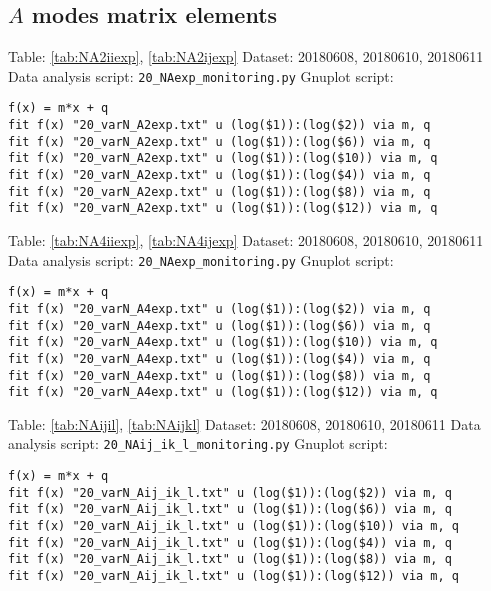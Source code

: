 \documentclass[12pt,a4paper]{article}
\begin{document}
\subsection{$A$ modes matrix elements}
Table: \ref{tab:NA2iiexp}, \ref{tab:NA2ijexp} \newline
Dataset: 20180608, 20180610, 20180611\newline
Data analysis script: \verb|20_NAexp_monitoring.py|\newline
Gnuplot script:
\begin{lstlisting}
f(x) = m*x + q
fit f(x) "20_varN_A2exp.txt" u (log($1)):(log($2)) via m, q
fit f(x) "20_varN_A2exp.txt" u (log($1)):(log($6)) via m, q
fit f(x) "20_varN_A2exp.txt" u (log($1)):(log($10)) via m, q
fit f(x) "20_varN_A2exp.txt" u (log($1)):(log($4)) via m, q
fit f(x) "20_varN_A2exp.txt" u (log($1)):(log($8)) via m, q
fit f(x) "20_varN_A2exp.txt" u (log($1)):(log($12)) via m, q
\end{lstlisting}
\mbox{}\newline
Table: \ref{tab:NA4iiexp}, \ref{tab:NA4ijexp} \newline
Dataset: 20180608, 20180610, 20180611\newline
Data analysis script: \verb|20_NAexp_monitoring.py|\newline
Gnuplot script:
\begin{lstlisting}
f(x) = m*x + q
fit f(x) "20_varN_A4exp.txt" u (log($1)):(log($2)) via m, q
fit f(x) "20_varN_A4exp.txt" u (log($1)):(log($6)) via m, q
fit f(x) "20_varN_A4exp.txt" u (log($1)):(log($10)) via m, q
fit f(x) "20_varN_A4exp.txt" u (log($1)):(log($4)) via m, q
fit f(x) "20_varN_A4exp.txt" u (log($1)):(log($8)) via m, q
fit f(x) "20_varN_A4exp.txt" u (log($1)):(log($12)) via m, q
\end{lstlisting}
\mbox{}\newline
Table: \ref{tab:NAijil}, \ref{tab:NAijkl} \newline
Dataset: 20180608, 20180610, 20180611\newline
Data analysis script: \verb|20_NAij_ik_l_monitoring.py|\newline
Gnuplot script:
\begin{lstlisting}
f(x) = m*x + q
fit f(x) "20_varN_Aij_ik_l.txt" u (log($1)):(log($2)) via m, q
fit f(x) "20_varN_Aij_ik_l.txt" u (log($1)):(log($6)) via m, q
fit f(x) "20_varN_Aij_ik_l.txt" u (log($1)):(log($10)) via m, q
fit f(x) "20_varN_Aij_ik_l.txt" u (log($1)):(log($4)) via m, q
fit f(x) "20_varN_Aij_ik_l.txt" u (log($1)):(log($8)) via m, q
fit f(x) "20_varN_Aij_ik_l.txt" u (log($1)):(log($12)) via m, q
\end{lstlisting}
\end{document}
